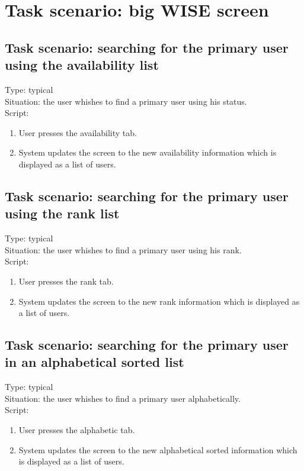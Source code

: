 \documentclass[11pt, a4paper,svglistings]{report}
\begin{document}
\section{Task scenario: big WISE screen}


\subsection{Task scenario: searching for the primary user using the availability list}


\label{subsec:availability}Type: typical \\
Situation: the user whishes to find a primary user using his status. \\
Script:
\begin{enumerate}
\item User presses the availability tab.
\item System updates the screen to the new availability information which is displayed as a list of users.
\end{enumerate}



\subsection{Task scenario: searching for the primary user using the rank list}


\label{subsec:rank}Type: typical \\
Situation: the user whishes to find a primary user using his rank. \\
Script:
\begin{enumerate}
\item User presses the rank tab.
\item System updates the screen to the new rank information which is displayed as a list of users.
\end{enumerate}


\subsection{Task scenario: searching for the primary user in an alphabetical sorted list}


\label{subsec:alphabetic}Type: typical \\
Situation: the user whishes to find a primary user alphabetically. \\
Script:
\begin{enumerate}
\item User presses the alphabetic tab.
\item System updates the screen to the new alphabetical sorted information which is displayed as a list of users.
\end{enumerate}
\end{document}

